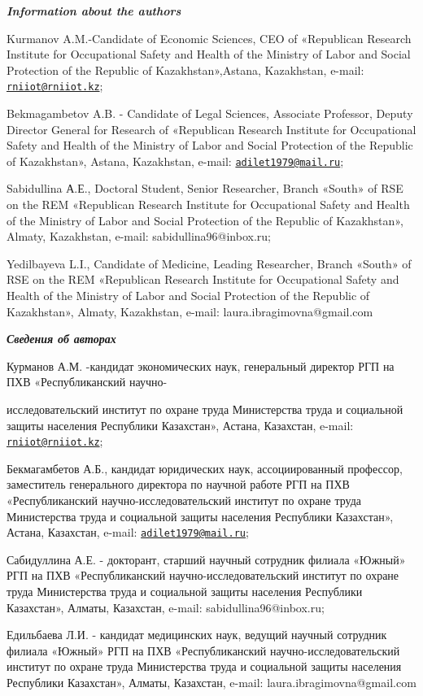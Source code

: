 \begin{authorinfo}

  \hspace{1em}\emph{{\bfseries Information about the authors}}

Kurmanov A.M.-Candidate of Economic Sciences, CEO of «Republican
Research Institute for Occupational Safety and Health of the Ministry of
Labor and Social Protection of the Republic of Kazakhstan»,Astana,
Kazakhstan, e-mail:
\href{mailto:rniiot@rniiot.kz}{\nolinkurl{rniiot@rniiot.kz}};

Bekmagambetov A.B. - Candidate of Legal Sciences, Associate Professor,
Deputy Director General for Research of «Republican Research Institute
for Occupational Safety and Health of the Ministry of Labor and Social
Protection of the Republic of Kazakhstan», Astana, Kazakhstan, e-mail:
\href{mailto:adilet1979@mail.ru}{\nolinkurl{adilet1979@mail.ru}};

Sabidullina А.Е., Doctoral Student, Senior Researcher, Branch «South» of
RSE on the REM «Republican Research Institute for Occupational Safety
and Health of the Ministry of Labor and Social Protection of the
Republic of Kazakhstan», Almaty, Kazakhstan, e-mail:
sabidullina96@inbox.ru;

Yedilbayeva L.I., Candidate of Medicine, Leading Researcher, Branch
«South» of RSE on the REM «Republican Research Institute for
Occupational Safety and Health of the Ministry of Labor and Social
Protection of the Republic of Kazakhstan», Almaty, Kazakhstan, e-mail:
laura.ibragimovna@gmail.com

\hspace{1em}\emph{{\bfseries Сведения об авторах}}

Курманов А.М. -кандидат экономических наук, генеральный директор РГП на
ПХВ «Республиканский научно-

исследовательский институт по охране труда
Министерства труда и социальной защиты населения Республики Казахстан»,
Астана, Казахстан, e-mail:
\href{mailto:rniiot@rniiot.kz}{\nolinkurl{rniiot@rniiot.kz}};

Бекмагамбетов А.Б., кандидат юридических наук, ассоциированный
профессор, заместитель генерального директора по научной работе РГП на
ПХВ «Республиканский научно-исследовательский институт по охране труда
Министерства труда и социальной защиты населения Республики Казахстан»,
Астана, Казахстан, e-mail:
\href{mailto:adilet1979@mail.ru}{\nolinkurl{adilet1979@mail.ru}};

Сабидуллина А.Е. - докторант, старший научный сотрудник филиала «Южный»
РГП на ПХВ «Республиканский научно-исследовательский институт по охране
труда Министерства труда и социальной защиты населения Республики
Казахстан», Алматы, Казахстан, e-mail: sabidullina96@inbox.ru;

Едильбаева Л.И. - кандидат медицинских наук, ведущий научный сотрудник
филиала «Южный» РГП на ПХВ «Республиканский научно-исследовательский
институт по охране труда Министерства труда и социальной защиты
населения Республики Казахстан», Алматы, Казахстан, e-mail:
laura.ibragimovna@gmail.com
\end{authorinfo}
